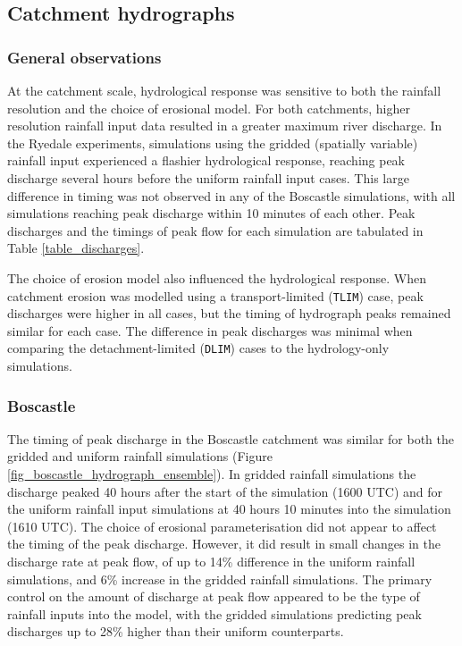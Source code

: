 \subsection{Catchment hydrographs}
\label{sec_hydrographs_flood}

\subsubsection{General observations}
At the catchment scale, hydrological response was sensitive to both the rainfall resolution and the choice of erosional model. For both catchments, higher resolution rainfall input data resulted in a greater maximum river discharge. In the Ryedale experiments, simulations using the gridded (spatially variable) rainfall input experienced a flashier hydrological response, reaching peak discharge several hours before the uniform rainfall input cases. This large difference in timing was not observed in any of the Boscastle simulations, with all simulations reaching peak discharge within 10 minutes of each other. Peak discharges and the timings of peak flow for each simulation are tabulated in Table \ref{table_discharges}.

The choice of erosion model also influenced the hydrological response. When catchment erosion was modelled using a transport-limited (\texttt{TLIM}) case, peak discharges were higher in all cases, but the timing of hydrograph peaks remained similar for each case. The difference in peak discharges was minimal when comparing the detachment-limited (\texttt{DLIM}) cases to the hydrology-only simulations.

\subsubsection{Boscastle}
The timing of peak discharge in the Boscastle catchment was similar for both the gridded and uniform rainfall simulations (Figure \ref{fig_boscastle_hydrograph_ensemble}). In gridded rainfall simulations the discharge peaked 40 hours after the start of the simulation (1600 UTC) and for the uniform rainfall input simulations at 40 hours 10 minutes into the simulation (1610 UTC). The choice of erosional parameterisation did not appear to affect the timing of the peak discharge. However, it did result in small changes in the discharge rate at peak flow, of up to 14\% difference in the uniform rainfall simulations, and 6\% increase in the gridded rainfall simulations. The primary control on the amount of discharge at peak flow appeared to be the type of rainfall inputs into the model, with the gridded simulations predicting peak discharges up to 28\% higher than their uniform counterparts. 

